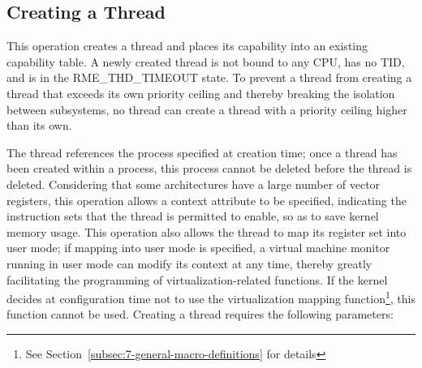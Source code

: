 \subsection{Creating a Thread}\label{subsec:4-create-a-thread}

This operation creates a thread and places its capability into an existing capability table. A newly created thread is not bound to any CPU, has no TID, and is in the RME\_THD\_TIMEOUT state. To prevent a thread from creating a thread that exceeds its own priority ceiling and thereby breaking the isolation between subsystems, no thread can create a thread with a priority ceiling higher than its own.

The thread references the process specified at creation time; once a thread has been created within a process, this process cannot be deleted before the thread is deleted. Considering that some architectures have a large number of vector registers, this operation allows a context attribute to be specified, indicating the instruction sets that the thread is permitted to enable, so as to save kernel memory usage. This operation also allows the thread to map its register set into user mode; if mapping into user mode is specified, a virtual machine monitor running in user mode can modify its context at any time, thereby greatly facilitating the programming of virtualization-related functions. If the kernel decides at configuration time not to use the virtualization mapping function\footnote{See Section~\ref{subsec:7-general-macro-definitions} for details}, this function cannot be used. Creating a thread requires the following parameters:

